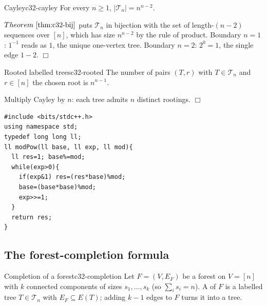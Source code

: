 \begin{theorem}{Cayley}{c32-cayley}
For every \(n\ge 1\), \(|\mathcal{T}_n| = n^{n-2}\).
\end{theorem}

\begin{proofbox}
\(\thmref{c32-bij}\) puts \(\mathcal{T}_n\) in bijection with the set of
length-\((n-2)\) sequences over \([n]\), which has size \(n^{n-2}\) by the
rule of product.  Boundary \(n=1\): \(1^{-1}\) reads as \(1\), the unique
one-vertex tree.  Boundary \(n=2\): \(2^0=1\), the single edge \(1\!-\!2\).
\(\Box\)
\end{proofbox}

\begin{theorem}{Rooted labelled trees}{c32-rooted}
The number of pairs \((T,r)\) with \(T\in\mathcal{T}_n\) and \(r\in[n]\) the
chosen root is \(n^{n-1}\).
\end{theorem}

\begin{proofbox}
Multiply Cayley by \(n\): each tree admits \(n\) distinct rootings. \(\Box\)
\end{proofbox}

\begin{lstlisting}[caption={Modular exponentiation, used to raise \(n\) to a fixed exponent modulo \(p\) in every counting application of this section. Iterative binary power, \(\bigO{\log e}\)}, label={lst:c32-modpow}]
#include <bits/stdc++.h>
using namespace std;
typedef long long ll;
ll modPow(ll base, ll exp, ll mod){
  ll res=1; base%=mod;
  while(exp>0){
    if(exp&1) res=(res*base)%mod;
    base=(base*base)%mod;
    exp>>=1;
  }
  return res;
}
\end{lstlisting}

\subsection{The forest-completion formula}

\begin{definition}{Completion of a forest}{c32-completion}
Let \(F=(V,E_F)\) be a forest on \(V=[n]\) with \(k\) connected components of
sizes \(s_1,\dots,s_k\) (so \(\sum_i s_i = n\)).  A  of \(F\)
is a labelled tree \(T\in\mathcal{T}_n\) with \(E_F\subseteq E(T)\); adding
\(k-1\) edges to \(F\) turns it into a tree.
\end{definition}

